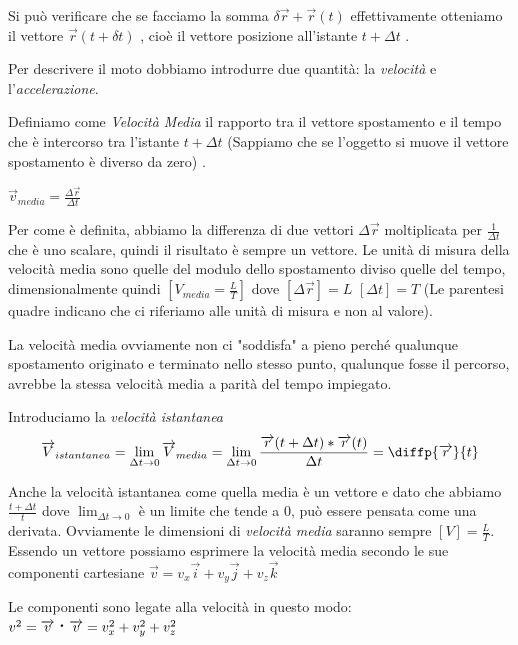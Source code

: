 Si può verificare che se facciamo la somma  $ \delta \overrightarrow{r} + \overrightarrow{r} ( t ) $ effettivamente otteniamo il vettore $ \overrightarrow{r} ( t + \delta t ) $ , cioè il vettore posizione all'istante $ t + \Delta t $ .

Per descrivere il moto dobbiamo introdurre due quantità: la \textit{velocità} e l'\textit{accelerazione}.

Definiamo come \textit{Velocità Media} il rapporto tra il vettore spostamento e il tempo che è intercorso 
tra l'istante $ t + \Delta t$ (Sappiamo che se l'oggetto si muove il vettore spostamento è diverso da zero) . 


$ \overrightarrow{v}_{media} =\frac{\Delta \overrightarrow{r} }{\Delta t} $ 


Per come è definita, abbiamo la differenza di due vettori $\Delta \overrightarrow{r} $
moltiplicata per $\frac{1}{\Delta t}$ che è uno scalare, quindi il risultato è sempre
un vettore. 
Le unità di misura della velocità media sono quelle del modulo dello spostamento
diviso quelle del tempo, dimensionalmente quindi $[V_{media}= \frac{L}{T} ]$ dove $[\Delta\overrightarrow{r}]= L$
$[\Delta t]= T$ (Le parentesi quadre indicano che ci riferiamo alle unità di misura e non al valore).

La velocità media ovviamente non ci "soddisfa" a pieno perché qualunque spostamento
originato e terminato nello stesso punto, qualunque fosse il percorso, avrebbe
la stessa velocità media a parità del tempo impiegato.

Introduciamo la \textit{velocità istantanea} 
\begin{equation} 
    \overrightarrow{V}_{istantanea}= 
    \lim_{\Delta t \to 0} \overrightarrow{V}_{media} = 
    \lim_{\Delta t \to 0} \frac { \overrightarrow{r}(t+\Delta t) * \overrightarrow{r}(t) }{\Delta t} = 
    \diffp{\overrightarrow{r}}{t}
\end{equation}

Anche la velocità istantanea come quella media è un vettore e dato che
abbiamo $\frac {t +\Delta t} {t}$ dove $\lim_{\Delta t \to 0}$  è un limite che tende a $0$,
può essere pensata come una derivata.
Ovviamente  le dimensioni di \textit{velocità media}
saranno sempre $[V]=\frac{L}{T}$.
 Essendo un vettore possiamo esprimere la velocità media
 secondo le sue componenti cartesiane 
 $\overrightarrow{v}= v_{x}\overrightarrow{i} + v_{y}\overrightarrow{j} + v_{z}\overrightarrow{k}$

Le componenti sono legate alla velocità in questo modo:
$v^2= \overrightarrow{v} \prodscal\overrightarrow{v}= v_{x}^2+v_{y}^2+v_{z}^2$

